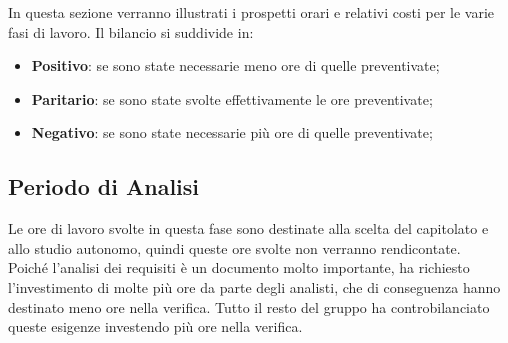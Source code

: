 \documentclass[../piano_di_progetto.tex]{subfiles}
\begin{document}
In questa sezione verranno illustrati i prospetti orari e relativi costi per le varie fasi di lavoro. Il bilancio si suddivide in:
\begin{itemize}
\item \textbf{Positivo}: se sono state necessarie meno ore di quelle preventivate;
\item \textbf{Paritario}: se sono state svolte effettivamente le ore preventivate;
\item \textbf{Negativo}: se sono state necessarie più ore di quelle preventivate;
\end{itemize}

\subsection{ Periodo di Analisi}%
\label{sub:cons_analisi}
Le ore di lavoro svolte in questa fase sono destinate alla scelta del capitolato e allo studio autonomo, quindi queste ore svolte non verranno rendicontate.\\
Poiché l'analisi dei requisiti è un documento molto importante, ha richiesto l'investimento di molte più ore da parte degli analisti, che di conseguenza hanno destinato meno ore nella verifica. 
Tutto il resto del gruppo ha controbilanciato queste esigenze investendo più ore nella verifica.
\end{document}
